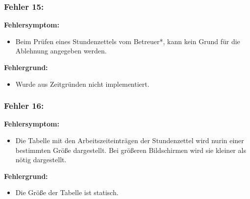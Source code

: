 \subsubsection{Fehler 15:}%
\textbf{Fehlersymptom:}
	\begin{itemize}
		\item Beim Prüfen eines Stundenzettels vom Betreuer*, kann kein Grund für die Ablehnung angegeben werden.
	\end{itemize}
\textbf{Fehlergrund:}
	\begin{itemize}
		\item Wurde aus Zeitgründen nicht implementiert.
	\end{itemize}

\subsubsection{Fehler 16:}%
\textbf{Fehlersymptom:}
	\begin{itemize}
		\item Die Tabelle mit den Arbeitszeiteinträgen der Stundenzettel wird nurin einer bestimmten Größe dargestellt. Bei größeren Bildschirmen wird sie kleiner als nötig dargestellt.
	\end{itemize}
\textbf{Fehlergrund:}
	\begin{itemize}
		\item Die Größe der Tabelle ist statisch.
	\end{itemize}
